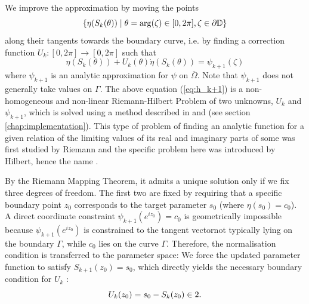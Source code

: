 We improve the approximation by moving the points $$\{\eta(S_k(\theta))\mid \theta = \arg(\zeta)\in[0,2\pi], \zeta\in\partial\mathbb{D} \}$$ along their tangents towards the boundary curve, i.e. by finding a correction function $U_k:[0,2\pi]\to[0,2\pi]$ such that \cite[Equation 30]{Wegmann1978_newtonverfahren}
\begin{equation}\label{eq:h_k+1}
    \eta(S_k(\theta))+U_k(\theta)\dot\eta(S_k(\theta)) = \psi_{k+1}(\zeta)
\end{equation}
where $\psi_{k+1}$ is an analytic approximation for $\psi$ on $\overline\Omega$. Note that $\psi_{k+1}$ does not generally take values on $\Gamma$. 
The above equation (\ref{eq:h_k+1}) is a non-homogeneous and non-linear Riemann-Hilbert Problem \cite{AnosovBolibruch1994_riemannhilbertproblems} of two unknowns, $U_k$ and $\psi_{k+1}$, which is solved using a method described in \cite[§ 87]{Muskhelishvili1977} and \cite{Wegmann1978_newtonverfahren} (see section \ref{chap:implementation}). 
This type of problem of finding an analytic function for a given relation of the limiting values of its real and imaginary parts of some was first studied by Riemann and the specific problem here was introduced by Hilbert, hence the name \cite[§89]{Muskhelishvili1977}.

By the Riemann Mapping Theorem, it admits a unique solution only if we fix three degrees of freedom. 
The first two are fixed by requiring that a specific boundary point $z_0$ corresponds to the target parameter $s_0$ (where $\eta(s_0) = c_0$). 
A direct coordinate constraint $\psi_{k+1}(e^{iz_0}) = c_0$ is geometrically impossible because $\psi_{k+1}(e^{iz_0})$ is constrained to the tangent vectornot typically lying on the boundary $\Gamma$, while $c_0$ lies on the curve $\Gamma$. 
Therefore, the normalisation condition is transferred to the parameter space:
We force the updated parameter function to satisfy $S_{k+1}(z_0) = s_0$, which directly yields the necessary boundary condition for $U_k$ \cite[Equation 2.4a]{Wegmann1978_newtonverfahren}:
\begin{equation}
    U_k(z_0)=s_0-S_k(z_0) \in 2.
\end{equation}

